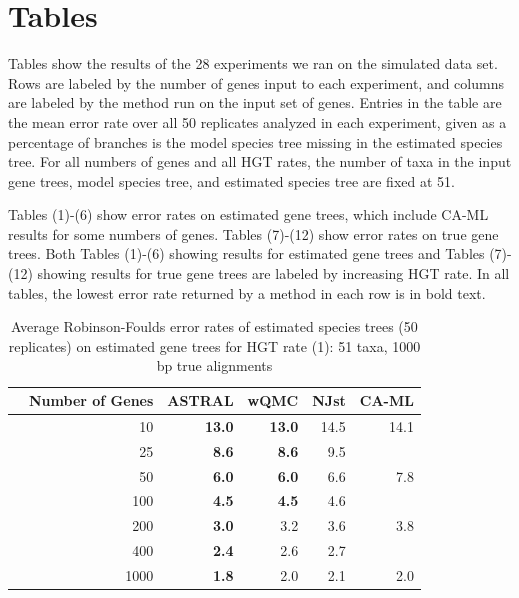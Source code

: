 \section{Tables}

Tables show the results of the 28 experiments we ran on the simulated data set. Rows are labeled by the number of genes input to each experiment, and columns are labeled by the method run on the input set of genes.  Entries in the table are the mean error rate over all 50 replicates analyzed in each experiment, given as a percentage of branches is the model species tree 
missing in the estimated species tree. 
For all numbers of genes and all HGT rates, the number of taxa in the input gene trees, model species tree, and estimated species tree are fixed at 51. 

Tables (1)-(6) show error rates on estimated gene trees, which include CA-ML results for some numbers of genes. Tables (7)-(12) show error rates on true gene trees.  Both Tables (1)-(6) showing results for estimated gene trees and Tables (7)-(12) showing results for true gene trees are labeled by increasing HGT rate. In all tables, the lowest error rate returned by a method in each row is in bold text.  



\begin{table}[h!]
\begin{tabular}{rrrrrr}
 & Number of Genes & ASTRAL & wQMC  & NJst & CA-ML\\
\hline
 & 10 & \textbf{13.0} & \textbf{13.0} &   14.5 & 14.1 \\
 & 25 & \textbf{8.6} & \textbf{8.6} &   9.5 & \\
 & 50 & \textbf{6.0} & \textbf{6.0} &   6.6 & 7.8 \\
 & 100 & \textbf{4.5} & \textbf{4.5}   & 4.6 & \\
 & 200 & \textbf{3.0} & 3.2 &   3.6 & 3.8\\
 & 400 & \textbf{2.4} & 2.6 &   2.7 & \\
 & 1000 & \textbf{1.8} & 2.0   & 2.1 & 2.0 \\
\end{tabular}
\caption[error rates of estimated species trees (50 replicates)  on estimated gene trees for HGT rate 1]{Average Robinson-Foulds error rates of estimated species trees (50 replicates)  on estimated gene trees for HGT rate (1): 51 taxa, 1000 bp true alignments}
\label{hgt::table1}
\end{table}



